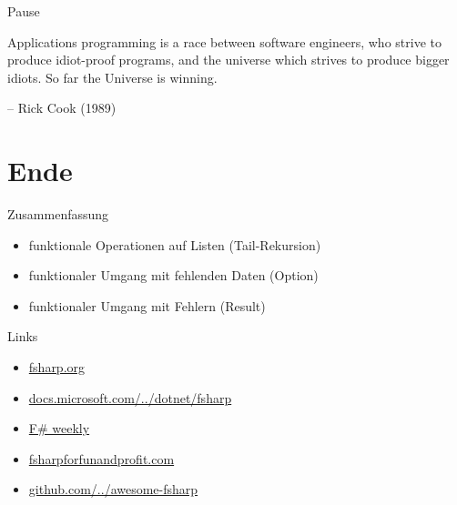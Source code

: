 \documentclass[t]{beamer}
\begin{document}
\begin{frame}[label={sec:orgff3bdd9}]{Pause}
\begin{block}{}
Applications programming is a race between software engineers, 
who strive to produce idiot-proof programs, 
and the universe which strives to produce bigger idiots. 
So far the Universe is winning.

\null\hfill-- Rick Cook (1989)
\end{block}
\end{frame}

\section{Ende }
\label{sec:org9f5fc5b}
\begin{frame}[label={sec:org66bfdb8}]{Zusammenfassung}
\begin{itemize}
\item funktionale Operationen auf Listen (Tail-Rekursion)
\item funktionaler Umgang mit fehlenden Daten (Option)
\item funktionaler Umgang mit Fehlern (Result)
\end{itemize}
\end{frame}

\begin{frame}[label={sec:orge66cb1b}]{Links}
\begin{itemize}
\item \href{https://fsharp.org/}{fsharp.org}
\item \href{https://docs.microsoft.com/de-de/dotnet/fsharp/}{docs.microsoft.com/../dotnet/fsharp}
\item \href{https://sergeytihon.com/}{F\# weekly}
\item \href{https://fsharpforfunandprofit.com/}{fsharpforfunandprofit.com}
\item \href{https://github.com/fsprojects/awesome-fsharp}{github.com/../awesome-fsharp}
\end{itemize}
\end{frame}
\end{document}
